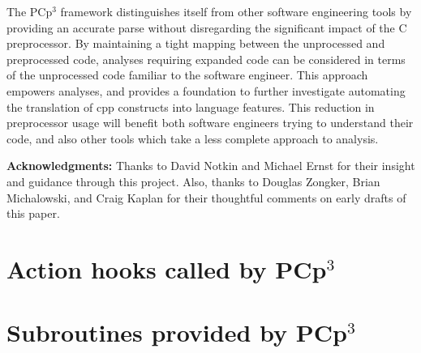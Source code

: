 \documentclass{article}
\newcommand{\pcp}{\mbox{\textsf{PCp}$^3$}}
\newcommand{\Cpp}{\mbox{\textsf{cpp}}}
\newcommand{\C}{\mbox{C}}
\begin{document}
The \pcp{} framework distinguishes itself from other software
engineering tools by providing an accurate parse without disregarding
the significant impact of the \C{} preprocessor.  By maintaining a tight
mapping between the unprocessed and preprocessed code, analyses
requiring expanded code can be considered in terms of the unprocessed
code familiar to the software engineer.  This approach empowers
analyses, and provides a foundation to further investigate automating
the translation of \Cpp{} constructs into language features.  This
reduction in preprocessor usage will benefit both software engineers
trying to understand their code, and also other tools which take a less
complete approach to analysis.

\vspace{1in}
\noindent \textbf{Acknowledgments:}  Thanks to David Notkin and Michael
Ernst for their insight and guidance through this project.  Also, thanks
to Douglas Zongker, Brian Michalowski, and Craig Kaplan for their
thoughtful comments on early drafts of this paper.


\appendix
\newpage

\section{Action hooks called by \pcp}
\begin{footnotesize}
\label{sec:hooks}
\begin{itemize}
\sloppy

\fussy
\end{itemize}
\end{footnotesize}

\newpage

\section{Subroutines provided by \pcp}
\label{sec:backcalls}
\begin{footnotesize}
\begin{itemize}
\sloppy

\fussy
\end{itemize}
\end{footnotesize}

\newpage


\nocite{ARM}
\nocite{Dragon}
\nocite{Glickstein97} %
\nocite{Camel}        %
\nocite{Perl}        %
\nocite{Levine92}     %
\nocite{Harbison91}   %
\nocite{Stroustrup97} %
\nocite{Stroustrup94} %
\nocite{Kernighan88}  %
\nocite{Flanagan96}   %
\nocite{EmpCpp}
\nocite{EmpCpp-TR}
\nocite{GCC}
\nocite{CTree}
\nocite{TXL}
\nocite{Cordy92}
\nocite{Bison}
\nocite{Flex}
\nocite{Krone94}
\nocite{Griswold96}
\nocite{Atkinson96}
\nocite{CD2DraftStandard}



\end{document}
